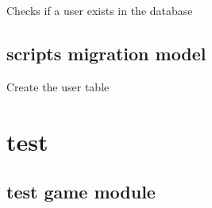 \documentclass[letterpaper,10pt,english]{sphinxmanual}
\begin{document}
\begin{fulllineitems}
\label{\detokenize{db/models/user:db.models.user.user_exists}}
\pysigstartsignatures
{}
\pysigstopsignatures
\sphinxAtStartPar
Checks if a user exists in the database

\end{fulllineitems}


\sphinxstepscope


\section{scripts migration model}
\label{\detokenize{db/scripts/migration:module-db.scripts.migration}}\label{\detokenize{db/scripts/migration:scripts-migration-model}}\label{\detokenize{db/scripts/migration::doc}}

\begin{fulllineitems}
\label{\detokenize{db/scripts/migration:db.scripts.migration.create_user_table}}
\pysigstartsignatures
{}
\pysigstopsignatures
\sphinxAtStartPar
Create the user table

\end{fulllineitems}


\sphinxstepscope


\chapter{test}
\label{\detokenize{tests:test}}\label{\detokenize{tests::doc}}
\sphinxstepscope


\section{test game module}
\label{\detokenize{tests/test_game:module-tests.test_game}}\label{\detokenize{tests/test_game:test-game-module}}\label{\detokenize{tests/test_game::doc}}
\end{document}
